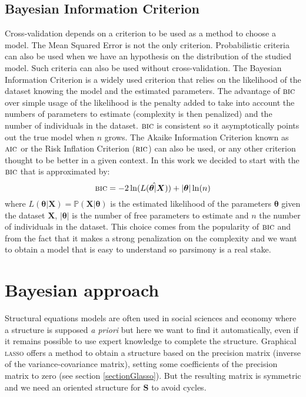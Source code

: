 \documentclass[12pt,a4paper]{report}
\begin{document}
			\subsection{ Bayesian Information Criterion}
			Cross-validation depends on a criterion to be used as a method to choose a model. The Mean Squared Error is not the only criterion. Probabilistic criteria can also be used when we have an hypothesis on the distribution of the studied model. Such criteria can also be used without cross-validation.
			The Bayesian Information Criterion \cite{BIChuard,schwarz1978estimating} is a widely used criterion that relies on the likelihood of the dataset knowing the model and the estimated parameters. The advantage of $\mbox{{\sc bic}}$ over simple usage of the likelihood is the penalty added to take into account the numbers of parameters to estimate (complexity is then penalized) and the number of individuals in the dataset. $\mbox{{\sc bic}}$ is consistent so it asymptotically points out the true model when $n$ grows. The Akaike Information Criterion \cite{akaike1974new} known as $\mbox{{\sc aic}}$ or the Risk Inflation Criterion \cite{foster1994risk} ($\mbox{{\sc ric}}$) can also be used, or any other criterion \cite{george1993variable} thought to be better in a given context.
			In this work we decided to start with the $\mbox{{\sc bic}}$ that is approximated by:
			\begin{equation}
				\mbox{{\sc bic}}=-2\ln(\hat{L(\boldsymbol{\theta}|\boldsymbol{X})})+|\boldsymbol{\theta}|\ln(n)
			\end{equation}
			where $L(\boldsymbol{\theta}|\boldsymbol{X})=\mathbb{P}(\boldsymbol{X}|\boldsymbol{\theta})$ is the estimated likelihood of the parameters $\boldsymbol{\theta}$ given the dataset $\boldsymbol{X}$, $|\boldsymbol{\theta}|$ is the number of free parameters to estimate and $n$ the number of individuals in the dataset. This choice comes from the popularity of $\mbox{{\sc bic}}$ and from the fact that it makes a strong penalization on the complexity and we want to obtain a model that is easy to understand so parsimony is a real stake.
			


\section{Bayesian approach}
Structural equations models are often used in social sciences and economy where a structure is supposed {\it a priori} but here we want to find it automatically, even if it remains possible to use expert knowledge to complete the structure. Graphical \textsc{lasso} \cite{friedman2008sparse} offers a method to obtain a structure based on the precision matrix (inverse of the variance-covariance matrix), setting some coefficients of the precision matrix to zero (see section \ref{sectionGlasso}). But the resulting matrix is symmetric and we need an oriented structure for $\boldsymbol{S}$ to avoid cycles.
\end{document}
